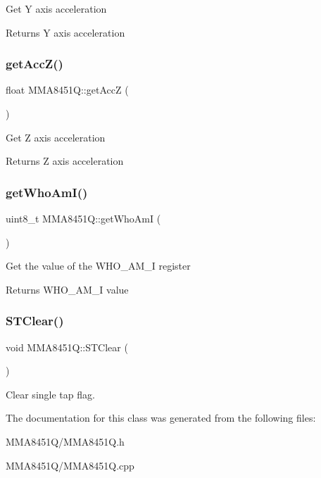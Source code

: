 Get Y axis acceleration

\begin{DoxyReturn}{Returns}
Y axis acceleration 
\end{DoxyReturn}
\mbox{\label{classMMA8451Q_afb63783e2e4d3af92229dd0311905132}} 
\subsubsection{\texorpdfstring{get\+Acc\+Z()}{getAccZ()}}
{\footnotesize\ttfamily float M\+M\+A8451\+Q\+::get\+AccZ (\begin{DoxyParamCaption}{ }\end{DoxyParamCaption})}

Get Z axis acceleration

\begin{DoxyReturn}{Returns}
Z axis acceleration 
\end{DoxyReturn}
\mbox{\label{classMMA8451Q_adbf87f413cfa95e88d49990b2a4af6d4}} 
\subsubsection{\texorpdfstring{get\+Who\+Am\+I()}{getWhoAmI()}}
{\footnotesize\ttfamily uint8\+\_\+t M\+M\+A8451\+Q\+::get\+Who\+AmI (\begin{DoxyParamCaption}{ }\end{DoxyParamCaption})}

Get the value of the W\+H\+O\+\_\+\+A\+M\+\_\+I register

\begin{DoxyReturn}{Returns}
W\+H\+O\+\_\+\+A\+M\+\_\+I value 
\end{DoxyReturn}
\mbox{\label{classMMA8451Q_ab64af19fd418c9439cf3c41530d63543}} 
\subsubsection{\texorpdfstring{S\+T\+Clear()}{STClear()}}
{\footnotesize\ttfamily void M\+M\+A8451\+Q\+::\+S\+T\+Clear (\begin{DoxyParamCaption}{ }\end{DoxyParamCaption})}

Clear single tap flag. 

The documentation for this class was generated from the following files\+:\begin{DoxyCompactItemize}
\item 
M\+M\+A8451\+Q/M\+M\+A8451\+Q.\+h\item 
M\+M\+A8451\+Q/M\+M\+A8451\+Q.\+cpp\end{DoxyCompactItemize}
